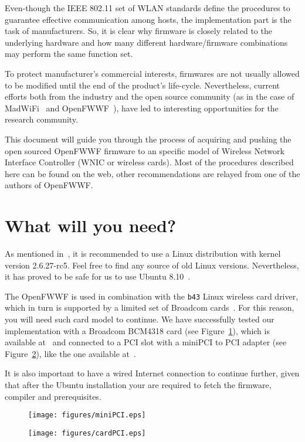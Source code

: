 \documentclass[conference]{IEEEtran}
\begin{document}
Even-though the IEEE 802.11 set of WLAN standards define the procedures to guarantee effective communication among hosts, the implementation part is the task of manufacturers. So, it is clear why firmware is closely related to the underlying hardware and how many different hardware/firmware combinations may perform the same function set.

To protect manufacturer's commercial interests, firmwares are not usually allowed to be modified until the end of the product's life-cycle. Nevertheless, current efforts both from the industry and the open source community (as in the case of MadWiFi~\cite{madWiFi} and OpenFWWF~\cite{OpenFWWF}), have led to interesting opportunities for the research community.

This document will guide you through the process of acquiring and pushing the open sourced OpenFWWF firmware to an specific model of Wireless Network Interface Controller (WNIC or wireless cards). Most of the procedures described here can be found on the web, other recommendations are relayed from one of the authors of OpenFWWF.

\section{What will you need?}\label{hardware}
As mentioned in~\cite{OpenFWWF}, it is recommended to use a Linux distribution with kernel version 2.6.27-rc5. Feel free to find any source of old Linux versions. Nevertheless, it has proved to be safe for us to use Ubuntu 8.10~\cite{ubuntu8}.

The OpenFWWF is used in combination with the \texttt{b43} Linux  wireless card driver, which in turn is supported by a limited set of Broadcom cards~\cite{b43-info}. For this reason, you will need such card model to continue. We have successfully tested our implementation with a Broadcom BCM4318 card (see Figure~\ref{fig:miniPCI}), which is available at~\cite{bcm4318} and connected to a PCI slot with a miniPCI to PCI adapter (see Figure~\ref{fig:PCI}), like the one available at~\cite{PCIAdapter}.

It is also important to have a wired Internet connection to continue further, given that after the Ubuntu installation your are required to fetch the firmware, compiler and prerequisites.

\begin{figure*}[t]
\centering
\begin{subfigure}{.5\textwidth}
  \centering
  \texttt{[image: figures/miniPCI.eps]}
  \caption{}
  \label{fig:miniPCI}
\end{subfigure}%
\begin{subfigure}{.5\textwidth}
  \centering
  \texttt{[image: figures/cardPCI.eps]}
  \caption{}
  \label{fig:PCI}
\end{subfigure}
\caption{\ref{fig:miniPCI}) Broadcom BCM418 miniPCI. \ref{fig:PCI}) Card correctly placed into the PCI adapter.}
\label{installedCard}
\end{figure*}
\end{document}
